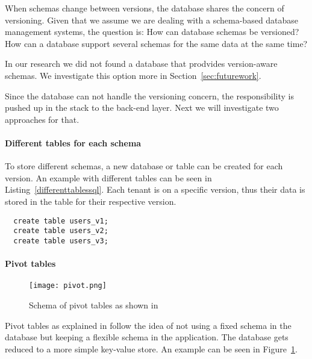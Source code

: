 When schemas change between versions, the database shares the concern of versioning. Given that we assume we are dealing with a schema-based database management systems, the question is: How can database schemas be versioned? How can a database support several schemas for the same data at the same time?

In our research we did not found a database that prodvides version-aware schemas. We investigate this option more in Section~\ref{sec:futurework}.


Since the database can not handle the versioning concern, the responsibility is pushed up in the stack to the back-end layer. Next we will investigate two approaches for that.

\paragraph{Different tables for each schema}

To store different schemas, a new database or table can be created for each version. An example with different tables can be seen in Listing~\ref{differenttablessql}. Each tenant is on a specific version, thus their data is stored in the table for their respective version.

\lstset{language=SQL, caption=sql, label=differenttablessql}
\begin{lstlisting}
  create table users_v1;
  create table users_v2;
  create table users_v3;
\end{lstlisting}

%

\paragraph{Pivot tables}

\begin{figure}
\centering
\texttt{[image: pivot.png]}
\caption{Schema of pivot tables as shown in \cite{Yaish2011}}
\label{fig:pivot}
\end{figure}

Pivot tables as explained in \cite{Yaish2011} \cite{Aulbach2011} \cite{Weissman2009} follow the idea of not using a fixed schema in the database but keeping a flexible schema in the application. The database gets reduced to a more simple key-value store. An example can be seen in Figure~\ref{fig:pivot}.

